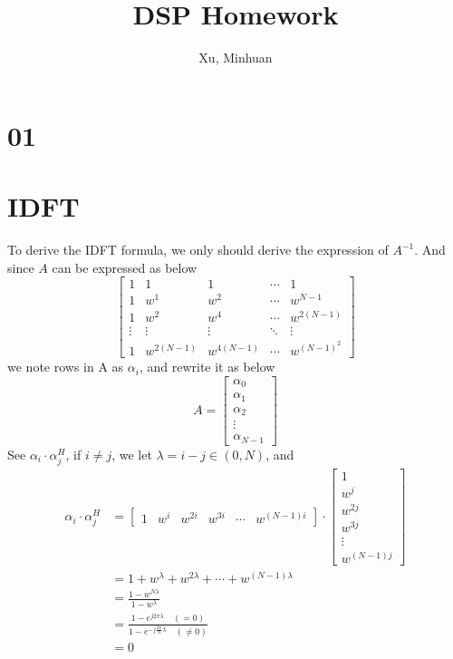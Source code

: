 \documentclass{article}
\begin{document}
\title{DSP Homework}
\author{Xu, Minhuan}
\maketitle
\tableofcontents
\begin{abstract}

\end{abstract}

\section{01}

\section{IDFT}
To derive the IDFT formula, we only should derive the expression of $A^{-1}$. And since $A$ can be expressed as below
$$
\begin{bmatrix}
 1 & 1 & 1 & \cdots & 1 \\
 1 & w^1 & w^2 & \cdots & w^{N - 1} \\
 1 & w^2 & w^4 & \cdots & w^{2(N - 1)}\\ 
 \vdots & \vdots & \vdots& \ddots & \vdots\\
 1 & w^{2(N - 1)} & w^{4(N - 1)} & \cdots & w^{(N - 1)^2}
 \end{bmatrix}
$$
we note rows in A as $\alpha_i$, and rewrite it as below
$$
A = 
\begin{bmatrix}
\alpha_0 \\ \alpha_1 \\ \alpha_2 \\ \vdots \\ \alpha_{N - 1}
 \end{bmatrix} 
$$
See $\alpha_i \cdot \alpha_j^H$, if $i \neq j$, we let $\lambda = i - j \in (0, N)$, and
\begin{equation}
\begin{aligned}
    \alpha_i \cdot \alpha_j^H &= \begin{bmatrix}
    1 & w^i & w^{2i} & w^{3i} & \cdots & w^{(N - 1)i}
     \end{bmatrix}
     \cdot
     \begin{bmatrix}
    1 \\ w^j \\ w^{2j} \\ w^{3j} \\ \vdots \\ w^{(N - 1)j}
     \end{bmatrix}\\
     &= 1 + w^{\lambda} + w^{2 \lambda} + \cdots + w^{(N - 1) \lambda}\\
     &= \frac{1 - w^{N \lambda}}{1 - w^{\lambda}}\\ 
     &= \frac{1 - e^{j 2\pi\lambda} \quad (= 0)}{1 - e^{-j\frac{2\pi}{N}\lambda} \quad (\neq 0)}\\ 
     &= 0
\end{aligned}
\label{eq:inj}
\end{equation}
\end{document}
